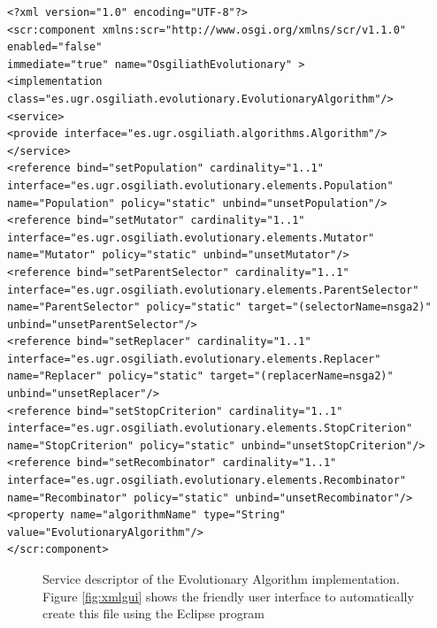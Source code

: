 \newsavebox{\mintedboxDS}
\begin{lrbox}{\mintedboxDS}
\begin{minipage}{10cm}
\begin{verbatim}
<?xml version="1.0" encoding="UTF-8"?>
<scr:component xmlns:scr="http://www.osgi.org/xmlns/scr/v1.1.0" enabled="false"
immediate="true" name="OsgiliathEvolutionary" >
<implementation class="es.ugr.osgiliath.evolutionary.EvolutionaryAlgorithm"/>
<service>
<provide interface="es.ugr.osgiliath.algorithms.Algorithm"/>
</service>
<reference bind="setPopulation" cardinality="1..1"
interface="es.ugr.osgiliath.evolutionary.elements.Population"
name="Population" policy="static" unbind="unsetPopulation"/>
<reference bind="setMutator" cardinality="1..1"
interface="es.ugr.osgiliath.evolutionary.elements.Mutator"
name="Mutator" policy="static" unbind="unsetMutator"/>
<reference bind="setParentSelector" cardinality="1..1"
interface="es.ugr.osgiliath.evolutionary.elements.ParentSelector"
name="ParentSelector" policy="static" target="(selectorName=nsga2)" 
unbind="unsetParentSelector"/>
<reference bind="setReplacer" cardinality="1..1"
interface="es.ugr.osgiliath.evolutionary.elements.Replacer"
name="Replacer" policy="static" target="(replacerName=nsga2)" 
unbind="unsetReplacer"/>
<reference bind="setStopCriterion" cardinality="1..1"
interface="es.ugr.osgiliath.evolutionary.elements.StopCriterion"
name="StopCriterion" policy="static" unbind="unsetStopCriterion"/>
<reference bind="setRecombinator" cardinality="1..1"
interface="es.ugr.osgiliath.evolutionary.elements.Recombinator"
name="Recombinator" policy="static" unbind="unsetRecombinator"/>
<property name="algorithmName" type="String" value="EvolutionaryAlgorithm"/>
</scr:component>
\end{verbatim}
\end{minipage}
\end{lrbox}

\begin{figure}
\usebox{\mintedboxDS}
\caption{Service descriptor of the Evolutionary Algorithm implementation.  Figure \ref{fig:xmlgui} shows the friendly user interface to automatically create  this file using the Eclipse program} 
\label{fig:ds} 
\end{figure}

